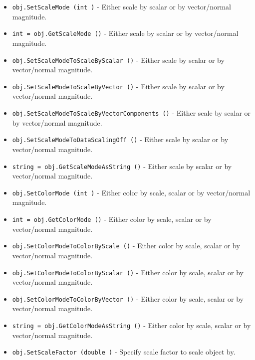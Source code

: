 \begin{itemize}
\item  \verb|obj.SetScaleMode (int )| -  Either scale by scalar or by vector/normal magnitude.

\item  \verb|int = obj.GetScaleMode ()| -  Either scale by scalar or by vector/normal magnitude.

\item  \verb|obj.SetScaleModeToScaleByScalar ()| -  Either scale by scalar or by vector/normal magnitude.

\item  \verb|obj.SetScaleModeToScaleByVector ()| -  Either scale by scalar or by vector/normal magnitude.

\item  \verb|obj.SetScaleModeToScaleByVectorComponents ()| -  Either scale by scalar or by vector/normal magnitude.

\item  \verb|obj.SetScaleModeToDataScalingOff ()| -  Either scale by scalar or by vector/normal magnitude.

\item  \verb|string = obj.GetScaleModeAsString ()| -  Either scale by scalar or by vector/normal magnitude.

\item  \verb|obj.SetColorMode (int )| -  Either color by scale, scalar or by vector/normal magnitude.

\item  \verb|int = obj.GetColorMode ()| -  Either color by scale, scalar or by vector/normal magnitude.

\item  \verb|obj.SetColorModeToColorByScale ()| -  Either color by scale, scalar or by vector/normal magnitude.

\item  \verb|obj.SetColorModeToColorByScalar ()| -  Either color by scale, scalar or by vector/normal magnitude.

\item  \verb|obj.SetColorModeToColorByVector ()| -  Either color by scale, scalar or by vector/normal magnitude.

\item  \verb|string = obj.GetColorModeAsString ()| -  Either color by scale, scalar or by vector/normal magnitude.

\item  \verb|obj.SetScaleFactor (double )| -  Specify scale factor to scale object by.


\end{itemize}
